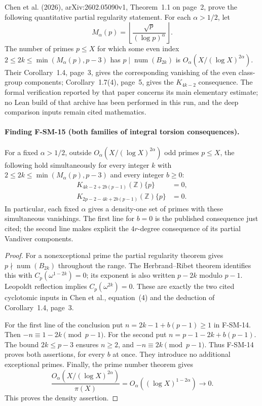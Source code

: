 Chen et al. (2026), arXiv:2602.05090v1, Theorem~1.1 on page~2, prove
the following quantitative partial regularity statement.  For each
$\alpha>1/2$, let
\[
 M_\alpha(p)=\left\lfloor\frac{\sqrt p}{(\log p)^\alpha}\right\rfloor.
\]
The number of primes $p\leq X$ for which some even index
$2\leq2k\leq\min(M_\alpha(p),p-3)$ has
$p\mid\operatorname{num}(B_{2k})$ is
$O_\alpha(X/(\log X)^{2\alpha})$.  Their Corollary~1.4, page~3,
gives the corresponding vanishing of the even class-group components;
Corollary~1.7(4), page~5, gives the $K_{4k-2}$ consequence.
The formal verification reported by that paper concerns its main
elementary estimate; no Lean build of that archive has been performed
in this run, and the deep comparison inputs remain cited mathematics.

\paragraph{Finding F-SM-15 (both families of integral torsion consequences).}
For a fixed $\alpha>1/2$, outside
$O_\alpha(X/(\log X)^{2\alpha})$ odd primes $p\leq X$, the following
hold simultaneously for every integer $k$ with
$2\leq2k\leq\min(M_\alpha(p),p-3)$ and every integer $b\geq0$:
\begin{align*}
 K_{4k-2+2b(p-1)}(\mathbb Z)\{p\}&=0,\\
 K_{2p-2-4k+2b(p-1)}(\mathbb Z)\{p\}&=0.
\end{align*}
In particular, each fixed $\alpha$ gives a density-one set of primes
with these simultaneous vanishings.  The first line for $b=0$ is the
published consequence just cited; the second line makes explicit the
$4r$-degree consequence of its partial Vandiver components.

\begin{proof}
For a nonexceptional prime the partial regularity theorem gives
$p\nmid\operatorname{num}(B_{2k})$ throughout the range.  The
Herbrand--Ribet theorem identifies this with
$C_p(\omega^{1-2k})=0$; its exponent is also written $p-2k$ modulo
$p-1$.  Leopoldt reflection implies
$C_p(\omega^{2k})=0$.  These are exactly the two cited cyclotomic
inputs in Chen et al., equation~(4) and the deduction of
Corollary~1.4, page~3.

For the first line of the conclusion put
$n=2k-1+b(p-1)\geq1$ in F-SM-14.  Then
$-n\equiv1-2k\pmod{p-1}$.  For the second put
$n=p-1-2k+b(p-1)$.  The bound $2k\leq p-3$ ensures $n\geq2$, and
$-n\equiv2k\pmod{p-1}$.  Thus F-SM-14 proves both assertions, for
every $b$ at once.  They introduce no additional exceptional primes.
Finally, the prime number theorem gives
\[
 \frac{O_\alpha(X/(\log X)^{2\alpha})}{\pi(X)}
       =O_\alpha((\log X)^{1-2\alpha})\longrightarrow0.
\]
This proves the density assertion.
\end{proof}

